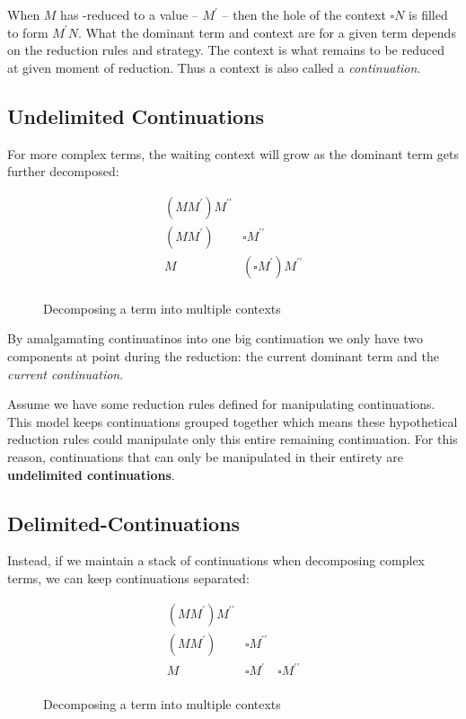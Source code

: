   When $M$ has \bta-reduced to a value -- $M^\prime$ -- then the hole
  of the context $\square N$ is filled to form $M^\prime N$. What the
  dominant term and context are for a given term depends on the
  reduction rules and strategy. The context is what remains to be
  reduced at given moment of reduction. Thus a context is also called
  a \emph{continuation}.
 
  \subsection{Undelimited Continuations} 
 
  For more complex terms, the waiting context will grow as the dominant
  term gets further decomposed:
  
  \begin{figure}[!h]
    \[
    \begin{array}{ll}
      (MM^\prime) M^{\prime\prime} \\
      (MM^\prime) & \square M^{\prime\prime} \\
      M & (\square M^\prime) M^{\prime\prime} \\
    \end{array}
    \]
  \caption{Decomposing a term into multiple contexts}
  \end{figure}

  By amalgamating continuatinos into one big continuation we only have
  two components at point during the reduction: the current dominant term
  and the \emph{current continuation}. 
  
  Assume we have some reduction rules defined for manipulating
  continuations. This model keeps continuations grouped together which
  means these hypothetical reduction rules could manipulate only this
  entire remaining continuation. For this reason, continuations that
  can only be manipulated in their entirety are \textbf{undelimited
  continuations}.

  \subsection{Delimited-Continuations}

  Instead, if we maintain a stack of continuations when
  decomposing complex terms, we can keep continuations separated:
  
  \begin{figure}[!h]
    \[
    \begin{array}{lll}
      (MM^\prime) M^{\prime\prime} \\
      (MM^\prime) & \square M^{\prime\prime} \\
      M & \square M^\prime & \square M^{\prime\prime} \\
    \end{array}
    \]
  \caption{Decomposing a term into multiple contexts}
  \end{figure}

